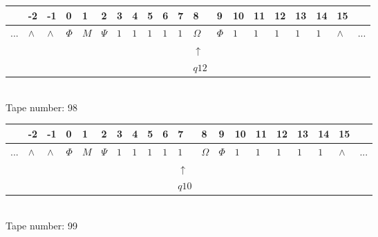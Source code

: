 \documentclass[11pt]{article}
\begin{document}
\begin{table}[H]
\centering
\begin{tabular}{llllllllllllllllllll}
 & -2 & -1 & 0 & 1 & 2 & 3 & 4 & 5 & 6 & 7 & 8 & 9 & 10 & 11 & 12 & 13 & 14 & 15 & \\
\hline
$...$ & \multicolumn{1}{|l|}{$\wedge$} & \multicolumn{1}{|l|}{$\wedge$} & \multicolumn{1}{|l|}{$\Phi$} & \multicolumn{1}{|l|}{$M$} & \multicolumn{1}{|l|}{$\Psi$} & \multicolumn{1}{|l|}{$1$} & \multicolumn{1}{|l|}{$1$} & \multicolumn{1}{|l|}{$1$} & \multicolumn{1}{|l|}{$1$} & \multicolumn{1}{|l|}{$1$} & \multicolumn{1}{|l|}{$\Omega$} & \multicolumn{1}{|l|}{$\Phi$} & \multicolumn{1}{|l|}{$1$} & \multicolumn{1}{|l|}{$1$} & \multicolumn{1}{|l|}{$1$} & \multicolumn{1}{|l|}{$1$} & \multicolumn{1}{|l|}{$1$} & \multicolumn{1}{|l|}{$\wedge$} & $...$\\
\hline
&  &  &  &  &  &  &  &  &  &  & $\uparrow$ &  &  &  &  &  &  &  &  \\
&  &  &  &  &  &  &  &  &  &  & $ q12 $ &  &  &  &  &  &  &  &  \\
\end{tabular}
\\
Tape number: 98
\noindent\makebox[\linewidth]{\hdashrule{\textwidth}{1pt}{1pt}}\end{table}

\begin{table}[H]
\centering
\begin{tabular}{llllllllllllllllllll}
 & -2 & -1 & 0 & 1 & 2 & 3 & 4 & 5 & 6 & 7 & 8 & 9 & 10 & 11 & 12 & 13 & 14 & 15 & \\
\hline
$...$ & \multicolumn{1}{|l|}{$\wedge$} & \multicolumn{1}{|l|}{$\wedge$} & \multicolumn{1}{|l|}{$\Phi$} & \multicolumn{1}{|l|}{$M$} & \multicolumn{1}{|l|}{$\Psi$} & \multicolumn{1}{|l|}{$1$} & \multicolumn{1}{|l|}{$1$} & \multicolumn{1}{|l|}{$1$} & \multicolumn{1}{|l|}{$1$} & \multicolumn{1}{|l|}{$1$} & \multicolumn{1}{|l|}{$\Omega$} & \multicolumn{1}{|l|}{$\Phi$} & \multicolumn{1}{|l|}{$1$} & \multicolumn{1}{|l|}{$1$} & \multicolumn{1}{|l|}{$1$} & \multicolumn{1}{|l|}{$1$} & \multicolumn{1}{|l|}{$1$} & \multicolumn{1}{|l|}{$\wedge$} & $...$\\
\hline
&  &  &  &  &  &  &  &  &  & $\uparrow$ &  &  &  &  &  &  &  &  &  \\
&  &  &  &  &  &  &  &  &  & $ q10 $ &  &  &  &  &  &  &  &  &  \\
\end{tabular}
\\
Tape number: 99
\noindent\makebox[\linewidth]{\hdashrule{\textwidth}{1pt}{1pt}}\end{table}
\end{document}
